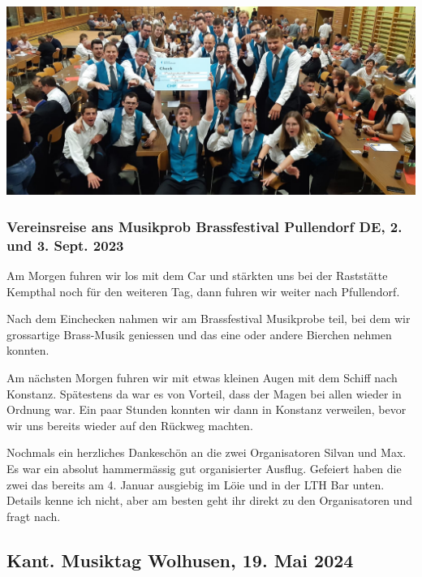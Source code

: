 \begin{history}
    \begin{MulticolFigure}
        \centering
        \includegraphics[width=0.93\linewidth]{./chap/2001-2024/2022/Feier-Welle.jpg}
    \end{MulticolFigure}


    \subsubsection*{Vereinsreise ans Musikprob Brassfestival Pullendorf DE, 2. und 3. Sept. 2023}

    Am Morgen fuhren wir los mit dem Car und stärkten uns bei der Raststätte
    Kempthal noch für den weiteren Tag, dann fuhren wir weiter nach Pfullendorf.

    Nach dem Einchecken nahmen wir am Brassfestival Musikprobe teil, bei dem wir
    grossartige Brass-Musik geniessen und das eine oder andere Bierchen nehmen
    konnten.

    Am nächsten Morgen fuhren wir mit etwas kleinen Augen mit dem Schiff nach
    Konstanz. Spätestens da war es von Vorteil, dass der Magen bei allen wieder
    in Ordnung war. Ein paar Stunden konnten wir dann in Konstanz verweilen,
    bevor wir uns bereits wieder auf den Rückweg machten.

    Nochmals ein herzliches Dankeschön an die zwei Organisatoren Silvan und Max.
    Es war ein absolut hammermässig gut organisierter Ausflug. Gefeiert haben
    die zwei das bereits am 4. Januar ausgiebig im Löie und in der LTH Bar
    unten. Details kenne ich nicht, aber am besten geht ihr direkt zu den
    Organisatoren und fragt nach.

\end{history}

\subsection*{Kant. Musiktag Wolhusen, 19. Mai 2024}

